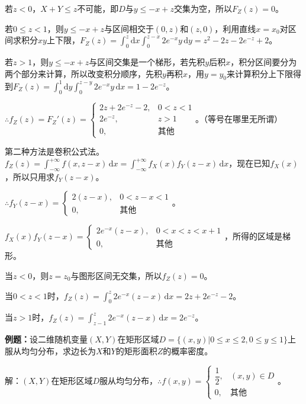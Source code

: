 \documentclass[UTF8, 12pt]{ctexart}
\begin{document}
若$z<0$，$X+Y\leqslant z$不可能，即$D$与$y\leqslant-x+z$交集为空，所以$F_Z(z)=0$。

若$0\leqslant z<1$，则$y\leqslant -x+z$与区间相交于$(0,z)$和$(z,0)$，利用直线$x=x_0$对区间求积分$xy$上下限，$F_Z(z)=\int_0^z\textrm{d}x\int_0^{z-x}2e^{-x}y\,\textrm{d}y=z^2-2z-2e^{-z}+2$。

若$z>1$，则$y\leqslant -x+z$与区间交集是一个梯形，若先积$y$后积$x$，积分区间要分为两个部分来计算，所以改变积分顺序，先积$y$再积$x$，用$y=y_0$来计算积分上下限得到$F_Z(z)=\int_0^1\textrm{d}y\int_0^{z-y}2e^{-x}y\,\textrm{d}x=1-2e^{-z}$。

$\therefore f_Z(z)=F_Z'(z)=\left\{\begin{array}{ll}
    2z+2e^{-z}-2, & 0<z<1 \\
    2e^{-z}, & z>1 \\
    0, & \textbf{其他}
\end{array}\right.$。（等号在哪里无所谓）

第二种方法是卷积公式法。$f_Z(z)=\int_{-\infty}^{+\infty}f(x,z-x)\,\textrm{d}x=\int_{-\infty}^{+\infty}f_X(x)f_Y(z-x)\,\textrm{d}x$，现在已知$f_X(x)$，所以只用求$f_Y(z-x)$。

$\therefore f_Y(z-x)=\left\{\begin{array}{ll}
    2(z-x), & 0<z-x<1 \\
    0, & \textbf{其他}
\end{array}\right.$。

$f_X(x)f_Y(z-x)=\left\{\begin{array}{ll}
    2e^{-x}(z-x), & 0<x<z<x+1 \\
    0, & \text{其他}
\end{array}\right.$，所得的区域是梯形。

当$z<0$，则$z=z_0$与图形区间无交集，所以$f_Z(z)=0$。

当$0<z<1$时，$f_Z(z)=\int_0^z2e^{-x}(z-x)\,\textrm{d}x=2z+2e^{-z}-2$。

当$z>1$时，$f_Z(z)=\int_{z-1}^z2e^{-x}(z-x)\,\textrm{d}x=2e^{-z}$。

\textbf{例题：}设二维随机变量$(X,Y)$在矩形区域$D=\{(x,y)|0\leqslant x\leqslant 2,0\leqslant y\leqslant 1\}$上服从均匀分布，求边长为$X$和$Y$的矩形面积$Z$的概率密度。

解：$(X,Y)$在矩形区域$D$服从均匀分布，$\therefore f(x,y)=\left\{\begin{array}{ll}
    \dfrac{1}{2}, & (x,y)\in D \\
    0, & \text{其他}
\end{array}\right.$。
\end{document}
